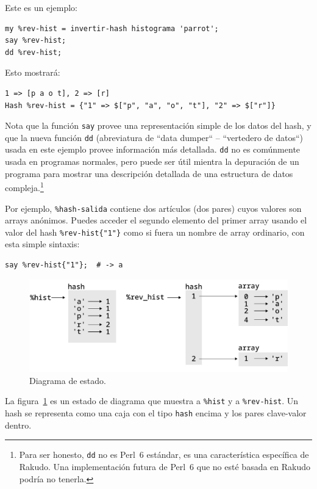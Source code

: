 Este es un ejemplo:

\begin{lstlisting}
my %rev-hist = invertir-hash histograma 'parrot';
say %rev-hist;
dd %rev-hist;
\end{lstlisting}

Esto mostrará:

\begin{lstlisting}
1 => [p a o t], 2 => [r]
Hash %rev-hist = {"1" => $["p", "a", "o", "t"], "2" => $["r"]}
\end{lstlisting}

Nota que la función {\tt say} provee una representación simple
de los datos del hash, y que la nueva función {\tt dd} (abreviatura 
de ``data dumper`` -- ``vertedero de datos``) usada en este ejemplo
provee información más detallada. {\tt dd} no es comúnmente usada en 
programas normales, pero puede ser útil mientra la depuración de un
programa para mostrar una descripción detallada de una estructura de 
datos compleja.\footnote{Para ser honesto, {\tt dd} no es Perl~6 estándar,
es una característica específica de Rakudo. Una implementación futura de Perl~6 que
no esté basada en Rakudo podría no tenerla.}

Por ejemplo, \verb|%hash-salida| contiene dos artículos (dos pares)
cuyos valores son arrays anónimos. Puedes acceder el segundo elemento
del primer array usando el valor del hash \verb|%rev-hist{"1"}|
como si fuera un nombre de array ordinario, con esta simple sintaxis:

\begin{lstlisting}
say %rev-hist{"1"};  # -> a
\end{lstlisting}


\begin{figure}
\centerline
{\includegraphics[scale=0.8]{figs/hash1.pdf}}
\caption{Diagrama de estado.}
\label{fig.hash1}
\end{figure}

La figura~\ref{fig.hash1} es un estado de diagrama que muestra a \verb|%hist| 
y a \verb|%rev-hist|. Un hash se representa como una caja con el tipo {\tt hash}
encima y los pares clave-valor dentro.

